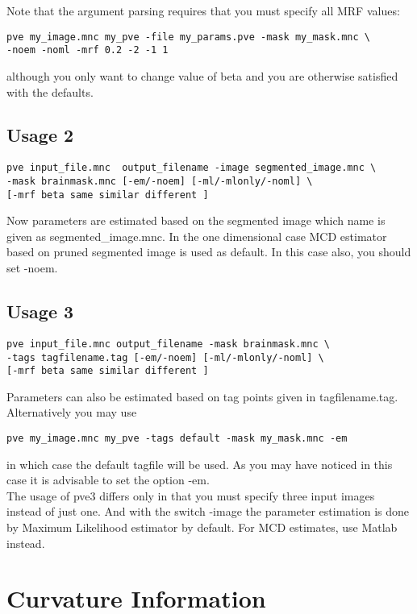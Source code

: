 \documentclass{article}
\begin{document}
Note that the argument parsing requires that you must specify
all MRF values:
\begin{verbatim}
pve my_image.mnc my_pve -file my_params.pve -mask my_mask.mnc \
-noem -noml -mrf 0.2 -2 -1 1
\end{verbatim}
although you only want to change value of beta and you are otherwise
satisfied with the defaults.

\subsection*{Usage 2}

\begin{verbatim} 
pve input_file.mnc  output_filename -image segmented_image.mnc \   
-mask brainmask.mnc [-em/-noem] [-ml/-mlonly/-noml] \
[-mrf beta same similar different ]
\end{verbatim}
Now parameters are estimated based on the segmented image which name is
given as segmented\_image.mnc. In the one dimensional case MCD
estimator based on pruned segmented image is used as default. In this
case also, you should set -noem. 

\subsection*{Usage 3}
\begin{verbatim} 
pve input_file.mnc output_filename -mask brainmask.mnc \
-tags tagfilename.tag [-em/-noem] [-ml/-mlonly/-noml] \
[-mrf beta same similar different ]
\end{verbatim}
Parameters can also be estimated based on tag points given in
tagfilename.tag. Alternatively you may use
\begin{verbatim} 
pve my_image.mnc my_pve -tags default -mask my_mask.mnc -em
\end{verbatim}
in which case the default tagfile will be used. As you may have
noticed in this case it is advisable to set the option -em.\\

The usage of pve3 differs only in that you must specify three input
images instead of just one. And with the switch -image the parameter
estimation is done by Maximum Likelihood estimator by default. For MCD 
estimates, use Matlab instead.

\section{Curvature Information}
\end{document}
